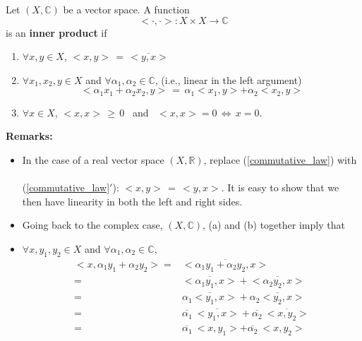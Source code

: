 \documentclass[11pt,twoside]{nsf_jwg}
\newenvironment{definition}{\vspace*{.3in}\noindent{\bf Definition: }}{ }
\newcommand{\RR}{{\mathbb{R}}}
\newcommand{\CC}{{\mathbb{C}}}
\begin{document}
\begin{definition}				\label{inner_product}
Let $(X,\CC)$ be a vector space.  A function
\[
	<\cdot,\cdot>: X \times X \rightarrow \CC
\]
is an \textbf{inner product} if
\begin{enumerate}
\setlength{\itemsep}{.3cm}
\setlength\itemindent{25pt}
\item $\forall x,y \in X$, $<x,y> \, = \, \overline{<y,x>}$		\label{commutative_law}
\item $\forall x_1,x_2,y \in X$ and $\forall \alpha_1,\alpha_2 \in {\mathbb C}$, (i.e., linear in the left argument) $$<\alpha_1 x_1 + \alpha_2 x_2, y> \, = \, \alpha_1 <x_1,y> + \alpha_2 <x_2,y>$$
\item $\forall x\in X$, $<x,x> \, \geqslant \, 0$
      \mbox{ and } $<x,x>=0 \, \Leftrightarrow \, x=0$. \medskip
\end{enumerate}
\end{definition}
\vspace*{.2cm}
\noindent \textbf{Remarks:}
\begin{itemize}
\setlength{\itemsep}{.3cm}
\setlength\itemindent{25pt}
\item In the case of a real vector space $(X,\RR)$, replace (\ref{commutative_law})
with \\ \\
(\ref{commutative_law}$'$): $<x,y> \, = \, <y,x>$. It is easy to show that we then have linearity in both the left and right sides.

\item Going back to the complex case, $(X,\CC)$, (a)  and (b) together imply that
\item $\forall x,y_1,y_2 \in X$ and $\forall \alpha_1,\alpha_2 \in {\mathbb C}$,
\begin{align*}
<x, \alpha_1 y_1 + \alpha_2 y_2> =& \overline{<\alpha_1 y_1 + \alpha_2 y_2,x>} \\
=&\overline{ <\alpha_1 y_1, x>} + \overline{ <\alpha_2 y_2, x>} \\
=&\overline{ \alpha_1 <y_1, x>} + \overline{ \alpha_2 <y_2, x>} \\
=&\overline{ \alpha_1} ~\overline{ <y_1, x>} + \overline{ \alpha_2} ~\overline{ <x,y_2>}\\
=&\overline{ \alpha_1} ~ <x, y_1> + \overline{ \alpha_2} ~ <x, y_2>\\
\end{align*}

\end{itemize}
\end{document}
